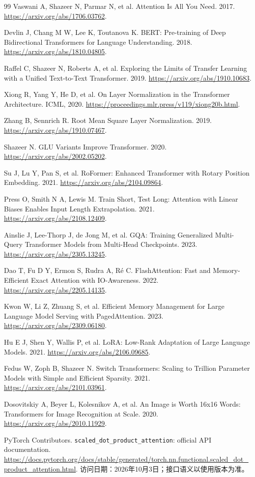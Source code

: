 \documentclass[UTF8,12pt,a4paper,fontset=fandol]{ctexart}
\begin{document}
\begin{thebibliography}{99}
Vaswani A, Shazeer N, Parmar N, et al.
Attention Is All You Need. 2017.
\url{https://arxiv.org/abs/1706.03762}.

Devlin J, Chang M W, Lee K, Toutanova K.
BERT: Pre-training of Deep Bidirectional Transformers for Language Understanding. 2018.
\url{https://arxiv.org/abs/1810.04805}.

Raffel C, Shazeer N, Roberts A, et al.
Exploring the Limits of Transfer Learning with a Unified Text-to-Text Transformer. 2019.
\url{https://arxiv.org/abs/1910.10683}.

Xiong R, Yang Y, He D, et al.
On Layer Normalization in the Transformer Architecture. ICML, 2020.
\url{https://proceedings.mlr.press/v119/xiong20b.html}.

Zhang B, Sennrich R.
Root Mean Square Layer Normalization. 2019.
\url{https://arxiv.org/abs/1910.07467}.

Shazeer N. GLU Variants Improve Transformer. 2020.
\url{https://arxiv.org/abs/2002.05202}.

Su J, Lu Y, Pan S, et al.
RoFormer: Enhanced Transformer with Rotary Position Embedding. 2021.
\url{https://arxiv.org/abs/2104.09864}.

Press O, Smith N A, Lewis M.
Train Short, Test Long: Attention with Linear Biases Enables Input Length Extrapolation. 2021.
\url{https://arxiv.org/abs/2108.12409}.

Ainslie J, Lee-Thorp J, de Jong M, et al.
GQA: Training Generalized Multi-Query Transformer Models from Multi-Head Checkpoints. 2023.
\url{https://arxiv.org/abs/2305.13245}.

Dao T, Fu D Y, Ermon S, Rudra A, R\'e C.
FlashAttention: Fast and Memory-Efficient Exact Attention with IO-Awareness. 2022.
\url{https://arxiv.org/abs/2205.14135}.

Kwon W, Li Z, Zhuang S, et al.
Efficient Memory Management for Large Language Model Serving with PagedAttention. 2023.
\url{https://arxiv.org/abs/2309.06180}.

Hu E J, Shen Y, Wallis P, et al.
LoRA: Low-Rank Adaptation of Large Language Models. 2021.
\url{https://arxiv.org/abs/2106.09685}.

Fedus W, Zoph B, Shazeer N.
Switch Transformers: Scaling to Trillion Parameter Models with Simple and Efficient Sparsity. 2021.
\url{https://arxiv.org/abs/2101.03961}.

Dosovitskiy A, Beyer L, Kolesnikov A, et al.
An Image is Worth 16x16 Words: Transformers for Image Recognition at Scale. 2020.
\url{https://arxiv.org/abs/2010.11929}.

PyTorch Contributors.
\texttt{scaled\_dot\_product\_attention}: official API documentation.
\url{https://docs.pytorch.org/docs/stable/generated/torch.nn.functional.scaled_dot_product_attention.html}.
访问日期：2026年10月3日；接口语义以使用版本为准。
\end{thebibliography}
\end{document}

